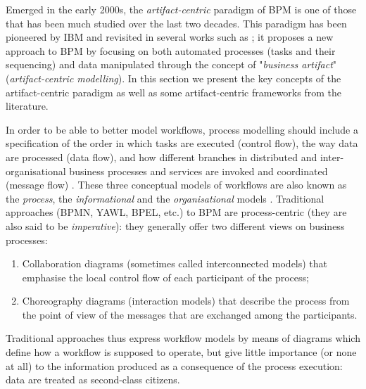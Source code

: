 \label{chap1:sec:data-aware-bpm}
Emerged in the early 2000s, the \textit{artifact-centric} paradigm of BPM is one of those that has been much studied over the last two decades. This paradigm has been pioneered by IBM \cite{nigam2003business} and revisited in several works such as \cite{abi2016towards, deutsch2014automatic, hull2009facilitating, lohmann2010artifact, assaf2017continuous, assaf2018generating, boaz2013bizartifact, lohmann2011artifact, estanol2012artifact}; it proposes a new approach to BPM by focusing on both automated processes (tasks and their sequencing) and data manipulated through the concept of "\textit{business artifact}" (\textit{artifact-centric modelling}). In this section we present the key concepts of the artifact-centric paradigm as well as some artifact-centric frameworks from the literature.

\label{chap1:sec:artifact-centric-bpm-key-concept}

\label{chap1:sec:aim-artifact-centric-bpm}
In order to be able to better model workflows, process modelling should include a specification of the order in which tasks are executed (control flow), the way data are processed (data flow), and how different branches in distributed and inter-organisational business processes and services are invoked and coordinated (message flow) \cite{lohmann2011artifact}. These three conceptual models of workflows are also known as the \textit{process}, the \textit{informational} and the \textit{organisational} models \cite{divitini2001inter}. Traditional approaches (BPMN, YAWL, BPEL, etc.) to BPM are process-centric (they are also said to be \textit{imperative}): they generally offer two different views on business processes: 
\begin{enumerate}
	\item Collaboration diagrams (sometimes called interconnected models) that emphasise the local control flow of each participant of the process;
	\item Choreography diagrams (interaction models) that describe the process from the point of view of the messages that are exchanged among the participants.
\end{enumerate}
Traditional approaches thus express workflow models by means of diagrams which define how a workflow is supposed to operate, but give little importance (or none at all) to the information produced as a consequence of the process execution: data are treated as second-class citizens.

